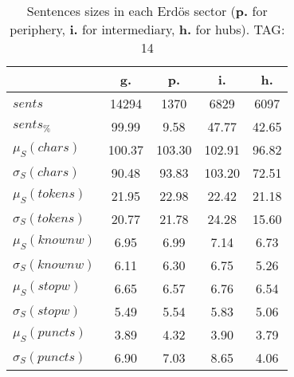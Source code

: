 \begin{table}[h!]
\begin{center}
\begin{tabular}{| l | c | c | c | c |}\hline
 & g. & p. & i. & h. \\\hline
$sents$ & 14294  & 1370  & 6829  & 6097 \\\hline
$sents_{\%}$ & 99.99  & 9.58  & 47.77  & 42.65 \\\hline
$\mu_S(chars)$ & 100.37  & 103.30  & 102.91  & 96.82 \\\hline
$\sigma_S(chars)$ & 90.48  & 93.83  & 103.20  & 72.51 \\\hline
$\mu_S(tokens)$ & 21.95  & 22.98  & 22.42  & 21.18 \\\hline
$\sigma_S(tokens)$ & 20.77  & 21.78  & 24.28  & 15.60 \\\hline
$\mu_S(knownw)$ & 6.95  & 6.99  & 7.14  & 6.73 \\\hline
$\sigma_S(knownw)$ & 6.11  & 6.30  & 6.75  & 5.26 \\\hline
$\mu_S(stopw)$ & 6.65  & 6.57  & 6.76  & 6.54 \\\hline
$\sigma_S(stopw)$ & 5.49  & 5.54  & 5.83  & 5.06 \\\hline
$\mu_S(puncts)$ & 3.89  & 4.32  & 3.90  & 3.79 \\\hline
$\sigma_S(puncts)$ & 6.90  & 7.03  & 8.65  & 4.06 \\\hline
\end{tabular}
\caption{Sentences sizes in each Erd\"os sector ({{\bf p.}} for periphery, {{\bf i.}} for intermediary, {{\bf h.}} for hubs). TAG: 14}
\end{center}
\end{table}
